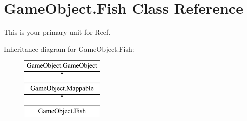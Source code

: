 \hypertarget{classGameObject_1_1Fish}{\section{\-Game\-Object.\-Fish \-Class \-Reference}
\label{classGameObject_1_1Fish}
}


\-This is your primary unit for \-Reef.  


\-Inheritance diagram for \-Game\-Object.\-Fish\-:\begin{figure}[H]
\begin{center}
\leavevmode
\includegraphics[height=3.000000cm]{classGameObject_1_1Fish}
\end{center}
\end{figure}
